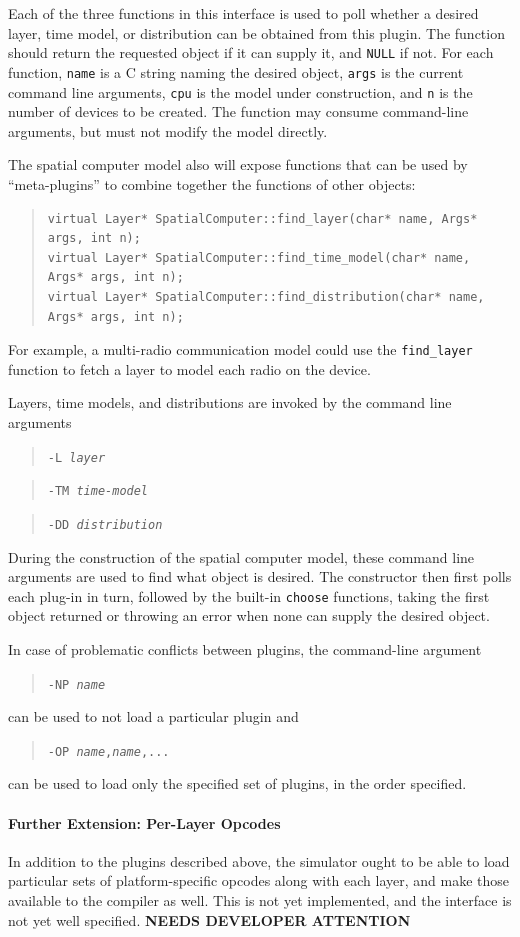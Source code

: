 \documentclass{article}
\newcommand\fixme{{\bf NEEDS DEVELOPER ATTENTION}}
\newcommand\code[1]{\begin{quote}\var{#1}\end{quote}}
\newcommand\var[1]{{\tt #1}}
\begin{document}
Each of the three functions in this interface is used to poll whether
a desired layer, time model, or distribution can be obtained from this
plugin.  The function should return the requested object if it can
supply it, and \var{NULL} if not.  For each function, \var{name} is a
C string naming the desired object, \var{args} is the current command
line arguments, \var{cpu} is the model under construction, and \var{n}
is the number of devices to be created.  The function may consume
command-line arguments, but must not modify the model directly.

The spatial computer model also will expose functions that can be used
by ``meta-plugins'' to combine together the functions of other
objects:
\begin{quote}
\begin{verbatim}
virtual Layer* SpatialComputer::find_layer(char* name, Args* args, int n);
virtual Layer* SpatialComputer::find_time_model(char* name, Args* args, int n);
virtual Layer* SpatialComputer::find_distribution(char* name, Args* args, int n);
\end{verbatim}
\end{quote}
For example, a multi-radio communication model could use the
\var{find\_layer} function to fetch a layer to model each radio on the
device.

Layers, time models, and distributions are invoked by the command line
arguments \code{-L {\it layer}} \code{-TM {\it time-model}} \code{-DD
  {\it distribution}}  

During the construction of the spatial computer model, these command
line arguments are used to find what object is desired.  The
constructor then first polls each plug-in in turn, followed by the
built-in \var{choose} functions, taking the first object returned or
throwing an error when none can supply the desired object.

In case of problematic conflicts between plugins, the command-line
argument \code{-NP {\it name}} can be used to not load a particular
plugin and \code{-OP {\it name},{\it name},...} can be used to load
only the specified set of plugins, in the order specified.

\paragraph{Further Extension: Per-Layer Opcodes}

In addition to the plugins described above, the simulator ought to be
able to load particular sets of platform-specific opcodes along with
each layer, and make those available to the compiler as well.  This
is not yet implemented, and the interface is not yet well specified.
\fixme{}
\end{document}
